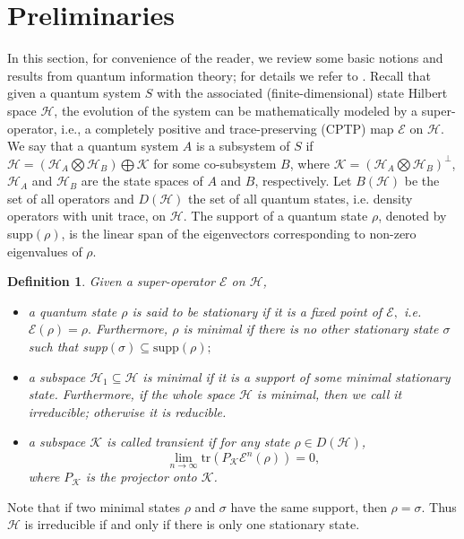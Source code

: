 \documentclass[journal]{IEEEtran}
\def\h{\ensuremath{\mathcal{H}}}
\def\k{\ensuremath{\mathcal{K}}}
\def\e{\ensuremath{\mathcal{E}}}
\def\k{\mathcal{K}}
\newtheorem{definition}{Definition}
\begin{document}
\section{Preliminaries}

In this section, for convenience of the reader, we review some basic notions and results from quantum information theory; for details we refer to \cite{nielsen2010quantum}. Recall that given a quantum system $S$ with the associated (finite-dimensional) state Hilbert space $\h$, the evolution of the system can be mathematically  modeled by a super-operator, i.e., a completely positive  and trace-preserving (CPTP) map $\e$ on $\h$.  We say that a quantum system $A$ is a subsystem of $S$ if $\h=(\h_A\bigotimes\h_B)\bigoplus \k$ for some co-subsystem $B$, where $\k=(\h_A\bigotimes\h_B)^\perp$, $\h_A$ and $\h_B$ are the state spaces  of $A$ and $B$, respectively.  
  Let $B(\h)$ be the set of all  operators and $D(\h)$ the set of all quantum states, i.e. density operators with unit trace, on $\h$.  The support of a quantum state $\rho$, denoted by supp$(\rho)$, is the linear span of the eigenvectors corresponding to non-zero eigenvalues of $\rho.$ 
\begin{definition}
  Given a super-operator $\e$ on $\h$, 
  \begin{itemize}
    \item[(1)] a quantum state  $\rho$ is said to be stationary if it is a fixed point of $\e,$ i.e. $\e(\rho)=\rho.$ Furthermore, $\rho$ is minimal if there is no other stationary state $\sigma$ such that supp$(\sigma)\subseteq \textrm{supp}(\rho);$
    \item[(2)] a subspace $\h_1\subseteq \h$ is minimal if it is a support of some minimal stationary state. Furthermore, if the whole space $\h$ is minimal, then we call it irreducible; otherwise it is reducible.
    \item[(3)] a subspace $\k$ is called transient if for any state $\rho\in D(\h)$, $$\lim_{n\rightarrow \infty}\textrm{tr}(P_\k\e^n(\rho))=0,$$ where $P_\k$ is the projector onto $\k$. 
  \end{itemize} 
\end{definition}

Note that if two minimal states $\rho$ and $\sigma$ have the same support, then $\rho=\sigma$. Thus $\h$ is irreducible if and only if there is only one stationary state.
\end{document}
